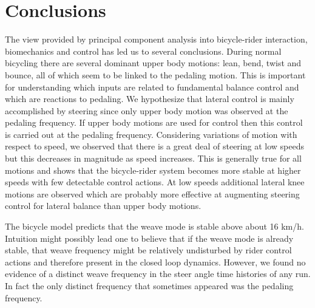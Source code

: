 \documentclass[smallextended]{svjour3}     %
\begin{document}
\section{Conclusions}
\label{sec:conclusions}
The view provided by principal component analysis into bicycle-rider
interaction, biomechanics and control has led us to several conclusions. During
normal bicycling there are several dominant upper body motions: lean, bend, twist and
bounce, all of which seem to be linked to the pedaling motion. This is
important for
understanding which inputs are related to fundamental balance
control and which are reactions to pedaling. We hypothesize
that lateral control is mainly accomplished by steering
since only upper body motion was observed at the pedaling frequency. If
upper body motions are used for control then this control is carried out at the pedaling
frequency. Considering variations of motion with respect to speed, we observed that there is
a great deal of steering at low speeds but this decreases in magnitude as speed
increases. This is generally true for all motions and shows that the
bicycle-rider system becomes more stable at higher speeds with few
detectable control actions. At low speeds additional lateral knee motions are
observed which are probably more effective at augmenting steering control for
lateral balance than upper body motions.

The bicycle model predicts that the weave
mode is stable above about 16 km/h. Intuition might possibly lead one to believe
that if the weave mode is already stable, that weave frequency might be
relatively undisturbed by rider control actions and therefore present in the
closed loop dynamics. However, we found no evidence of a distinct
weave frequency in the steer angle time histories of any run. In fact the only
distinct frequency that sometimes appeared was the pedaling frequency.
\end{document}
